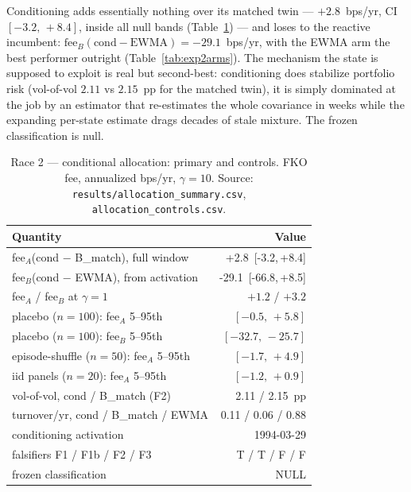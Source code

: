 \documentclass[11pt]{article}
\newcommand{\aidraft}[1]{{\color{aidraftcolor}#1}} %
\newcommand{\aidraft}[1]{#1}
\newcommand{\feeAmatch}{+2.8}
\newcommand{\feeAmatchci}{[-3.2,\,+8.4]}
\newcommand{\feeBreact}{-29.1}
\newcommand{\feeBreactci}{[-66.8,\,+8.5]}
\newcommand{\volofvolCond}{2.11}
\newcommand{\volofvolMatch}{2.15}
\begin{document}
\aidraft{%
Conditioning adds essentially nothing over its matched twin --- $\feeAmatch$~bps/yr, CI
$\feeAmatchci$, inside all null bands (Table~\ref{tab:exp2}) --- and loses to the reactive
incumbent: $\text{fee}_B(\text{cond}-\text{EWMA}) = \feeBreact$~bps/yr, with the EWMA arm the best
performer outright (Table~\ref{tab:exp2arms}).
The mechanism the state is supposed to exploit is real but second-best: conditioning does stabilize
portfolio risk (vol-of-vol $\volofvolCond$ vs $\volofvolMatch$~pp for the matched twin), it is simply
dominated at the job by an estimator that re-estimates the whole covariance in weeks while the
expanding per-state estimate drags decades of stale mixture.
The frozen classification is null.%
}

\begin{table}[t]
\centering
\small
\caption{Race 2 --- conditional allocation: primary and controls. FKO fee, annualized bps/yr,
$\gamma{=}10$. Source: \texttt{results/allocation\_summary.csv}, \texttt{allocation\_controls.csv}.}
\label{tab:exp2}
\begin{tabular}{lr}
\toprule
Quantity & Value \\
\midrule
fee$_A$(cond $-$ B\_match), full window       & \feeAmatch~\feeAmatchci \\
fee$_B$(cond $-$ EWMA), from activation       & \feeBreact~\feeBreactci \\
fee$_A$ / fee$_B$ at $\gamma{=}1$             & $+1.2$ / $+3.2$ \\
placebo ($n{=}100$): fee$_A$ 5--95th          & $[-0.5,\,+5.8]$ \\
placebo ($n{=}100$): fee$_B$ 5--95th          & $[-32.7,\,-25.7]$ \\
episode-shuffle ($n{=}50$): fee$_A$ 5--95th   & $[-1.7,\,+4.9]$ \\
iid panels ($n{=}20$): fee$_A$ 5--95th        & $[-1.2,\,+0.9]$ \\
vol-of-vol, cond / B\_match (F2)              & \volofvolCond{} / \volofvolMatch{}~pp \\
turnover/yr, cond / B\_match / EWMA          & 0.11 / 0.06 / 0.88 \\
conditioning activation                       & 1994-03-29 \\
falsifiers F1 / F1b / F2 / F3                  & T / T / F / F \\
frozen classification                         & NULL \\
\bottomrule
\end{tabular}
\end{table}
\end{document}
